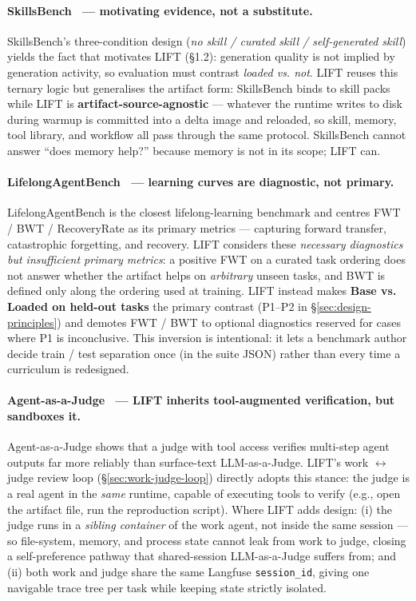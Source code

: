 \documentclass{article}
\begin{document}
\paragraph{SkillsBench~\citep{li2026skillsbench} --- motivating evidence, not a substitute.} SkillsBench's three-condition design (\emph{no skill / curated skill / self-generated skill}) yields the fact that motivates LIFT (\S1.2): generation quality is not implied by generation activity, so evaluation must contrast \emph{loaded vs. not}. LIFT reuses this ternary logic but generalises the artifact form: SkillsBench binds to skill packs while LIFT is \textbf{artifact-source-agnostic} --- whatever the runtime writes to disk during warmup is committed into a delta image and reloaded, so skill, memory, tool library, and workflow all pass through the same protocol. SkillsBench cannot answer ``does memory help?'' because memory is not in its scope; LIFT can.

\paragraph{LifelongAgentBench~\citep{zheng2025lifelongagentbench} --- learning curves are diagnostic, not primary.} LifelongAgentBench is the closest lifelong-learning benchmark and centres FWT / BWT / RecoveryRate as its primary metrics --- capturing forward transfer, catastrophic forgetting, and recovery. LIFT considers these \emph{necessary diagnostics but insufficient primary metrics}: a positive FWT on a curated task ordering does not answer whether the artifact helps on \emph{arbitrary} unseen tasks, and BWT is defined only along the ordering used at training. LIFT instead makes \textbf{Base vs. Loaded on held-out tasks} the primary contrast (P1--P2 in \S\ref{sec:design-principles}) and demotes FWT / BWT to optional diagnostics reserved for cases where P1 is inconclusive. This inversion is intentional: it lets a benchmark author decide train / test separation once (in the suite JSON) rather than every time a curriculum is redesigned.

\paragraph{Agent-as-a-Judge~\citep{zhuge2024agentasajudge} --- LIFT inherits tool-augmented verification, but sandboxes it.} Agent-as-a-Judge shows that a judge with tool access verifies multi-step agent outputs far more reliably than surface-text LLM-as-a-Judge. LIFT's work $\leftrightarrow$ judge review loop (\S\ref{sec:work-judge-loop}) directly adopts this stance: the judge is a real agent in the \emph{same} runtime, capable of executing tools to verify (e.g., open the artifact file, run the reproduction script). Where LIFT adds design: (i) the judge runs in a \emph{sibling container} of the work agent, not inside the same session --- so file-system, memory, and process state cannot leak from work to judge, closing a self-preference pathway that shared-session LLM-as-a-Judge suffers from; and (ii) both work and judge share the same Langfuse \texttt{session\_id}, giving one navigable trace tree per task while keeping state strictly isolated.
\end{document}
